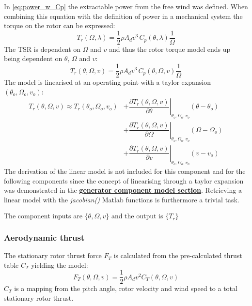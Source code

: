 In \cref{eq:power_w_Cp} the extractable power from the free wind was defined. When combining this equation with the definition of power in a mechanical system the torque on the rotor can be expressed:
\begin{equation}\label{eq:comp_Mrot_lambda}
	T_r(\Omega, \lambda) = \dfrac{1}{2} \rho A_d v^3 \, C_p(\theta, \lambda) \dfrac{1}{\Omega}
\end{equation}
The TSR is dependent on $ \Omega $ and $ v $ and thus the rotor torque model ends up being dependent on $ \theta $, $ \Omega $ and $ v $:
\begin{equation}\label{eq:comp_Mrot_wind}
	T_r(\theta, \Omega, v) = \dfrac{1}{2} \rho A_d v^3 \, C_p(\theta, \Omega, v) \dfrac{1}{\Omega}
\end{equation}
The model is linearised at an operating point with a taylor expansion $ (\theta_o, \Omega_o, v_o) $:
\begin{align}
	T_r(\theta, \Omega, v) \approx T_r(\theta_o, \Omega_o, v_o) 
	& + \left. \dfrac{\partial T_r(\theta, \Omega, v)}{\partial \theta} \right |_{\theta_o, \Omega_o, v_o} ( \theta-\theta_o) \\
	& + \left. \dfrac{\partial T_r(\theta, \Omega, v)}{\partial \Omega} \right |_{\theta_o, \Omega_o, v_o} ( \Omega-\Omega_o) \\
	& + \left. \dfrac{\partial T_r(\theta, \Omega, v)}{\partial v} \right |_{\theta_o, \Omega_o, v_o} ( v - v_o)
\end{align}
The derivation of the linear model is not included for this component and for the following components since the concept of linearising through a taylor expansion was demonstrated in the \hyperref[sec:comp_generator]{\textbf{generator component model section}}. Retrieving a linear model with the \textit{jacobian()} Matlab functions is furthermore a trivial task.

The component inputs are $ \{\theta, \Omega, v\} $ and the output is $ \{T_r\} $

\subsubsection{Aerodynamic thrust} \label{sec:comp_aero_thrust}
The stationary rotor thrust force $ F_T $ is calculated from the pre-calculated thrust table $ C_T $ yielding the model:
\begin{equation} \label{eq:comp_aero_thrust}
	F_T(\theta, \Omega, v) = \dfrac{1}{2} \rho A_d v^2 C_T(\theta, \Omega, v)
\end{equation}
$ C_T $ is a mapping from the pitch angle, rotor velocity and wind speed to a total stationary rotor thrust.

